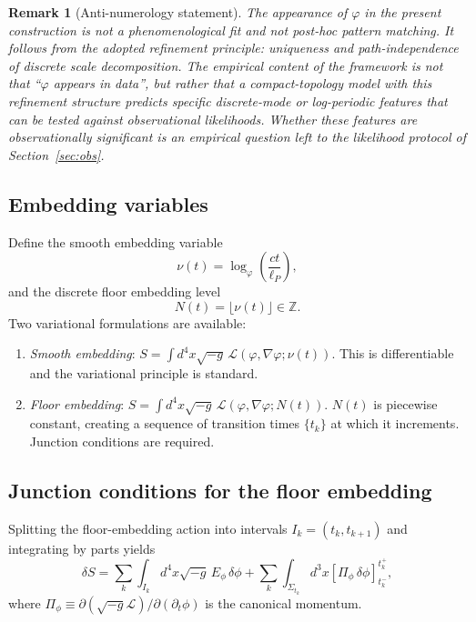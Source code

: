 \documentclass[12pt,a4paper]{article}
\newtheorem{remark}{Remark}[section]
\newcommand{\Sig}{\Sigma}           %
\newcommand{\NN}{N}          %
\newcommand{\nnu}{\nu}       %
\begin{document}
\begin{remark}[Anti-numerology statement]
The appearance of $\varphi$ in the present construction is
not a phenomenological fit and not post-hoc pattern
matching. It follows from the adopted refinement principle:
uniqueness and path-independence of discrete scale
decomposition. The empirical content of the framework is
not that ``$\varphi$ appears in data'', but rather that a
compact-topology model with this refinement structure
predicts specific discrete-mode or log-periodic features
that can be tested against observational likelihoods.
Whether these features are observationally significant is
an empirical question left to the likelihood protocol of
Section~\ref{sec:obs}.
\end{remark}

\subsection{Embedding variables}

Define the smooth embedding variable
\begin{equation}
  \nnu(t) = \log_\varphi\!\left(\frac{ct}{\ell_P}\right),
  \label{eq:nu}
\end{equation}
and the discrete floor embedding level
\begin{equation}
  \NN(t) = \lfloor\nnu(t)\rfloor \in \mathbb{Z}.
  \label{eq:N}
\end{equation}
Two variational formulations are available:
\begin{enumerate}
\item[(I)] \emph{Smooth embedding}: $S = \int d^4x\sqrt{-g}\,
  \mathcal{L}(\varphi,\nabla\varphi;\nnu(t))$.
  This is differentiable and the variational principle is
  standard.
\item[(II)] \emph{Floor embedding}: $S = \int d^4x\sqrt{-g}\,
  \mathcal{L}(\varphi,\nabla\varphi;\NN(t))$.
  $\NN(t)$ is piecewise constant, creating a sequence of
  transition times $\{t_k\}$ at which it increments.
  Junction conditions are required.
\end{enumerate}

\subsection{Junction conditions for the floor embedding}

Splitting the floor-embedding action into intervals
$I_k = (t_k, t_{k+1})$ and integrating by parts yields
\begin{equation}
  \delta S = \sum_k\int_{I_k} d^4x\sqrt{-g}\,E_\phi\,\delta\phi
  + \sum_k\int_{\Sig_{t_k}} d^3x
  \left[\Pi_\phi\,\delta\phi\right]^{t_k^+}_{t_k^-},
  \label{eq:junctionvar}
\end{equation}
where
$\Pi_\phi \equiv \partial(\sqrt{-g}\mathcal{L})/\partial(\partial_t\phi)$
is the canonical momentum.
\end{document}
